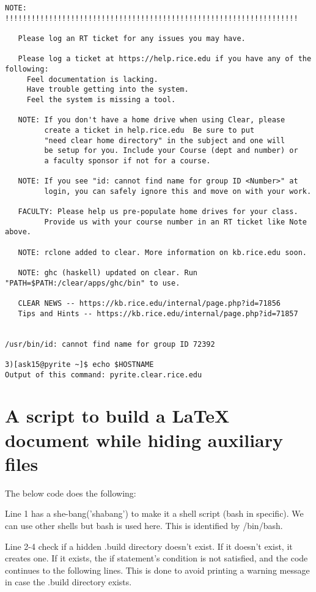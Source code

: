 \documentclass{article}
\begin{document}
\begin{verbatim}
NOTE: !!!!!!!!!!!!!!!!!!!!!!!!!!!!!!!!!!!!!!!!!!!!!!!!!!!!!!!!!!!!!!!!!!!

   Please log an RT ticket for any issues you may have.

   Please log a ticket at https://help.rice.edu if you have any of the following:
     Feel documentation is lacking.
     Have trouble getting into the system.
     Feel the system is missing a tool.

   NOTE: If you don't have a home drive when using Clear, please
         create a ticket in help.rice.edu  Be sure to put
         "need clear home directory" in the subject and one will
         be setup for you. Include your Course (dept and number) or
         a faculty sponsor if not for a course.

   NOTE: If you see "id: cannot find name for group ID <Number>" at
         login, you can safely ignore this and move on with your work.

   FACULTY: Please help us pre-populate home drives for your class.
         Provide us with your course number in an RT ticket like Note above.

   NOTE: rclone added to clear. More information on kb.rice.edu soon.

   NOTE: ghc (haskell) updated on clear. Run "PATH=$PATH:/clear/apps/ghc/bin" to use.

   CLEAR NEWS -- https://kb.rice.edu/internal/page.php?id=71856
   Tips and Hints -- https://kb.rice.edu/internal/page.php?id=71857


/usr/bin/id: cannot find name for group ID 72392

3)[ask15@pyrite ~]$ echo $HOSTNAME
Output of this command: pyrite.clear.rice.edu
\end{verbatim}

\section{A script to build a LaTeX document while hiding auxiliary files}

The below code does the following:

Line 1 has a she-bang('shabang') to make it a shell script (bash in specific). We can use other shells but bash is used here. This is identified by /bin/bash.

Line 2-4 check if a hidden .build directory doesn't exist. If it doesn't exist, it creates one. If it exists, the if statement's condition is not satisfied, and the code continues to the following lines. This is done to avoid printing a warning message in case the .build directory exists.
\end{document}
